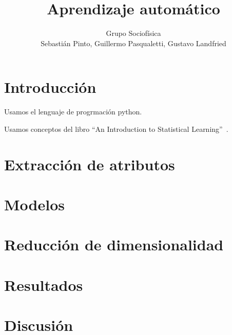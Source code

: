 \documentclass[a4paper,10pt]{article}
\title{Aprendizaje autom\'atico}
\author{Grupo Sociof\'isica \\
Sebasti\'an Pinto, Guillermo Pasqualetti, Gustavo Landfried}
\begin{document}
\maketitle

\section{Introducci\'on}

Usamos el lenguaje de progrmaci\'on python. 

Usamos conceptos del libro ``An Introduction to Statistical Learning''~\cite{james_hastie_tibshirani}.

\section{Extracci\'on de atributos}

\begin{comment}
  \begin{figure}[H]
    \centering
    \begin{subfigure}[b]{0.4\textwidth}
      \texttt{[image: ../Imagenes/artificial\_sigmoid\_fit]}
      \caption{}
    \end{subfigure}
  \end{figure}
\end{comment}

\section{Modelos}

\section{Reducci\'on de dimensionalidad}

\section{Resultados}

\section{Discusi\'on}


\scriptsize


\end{document}
